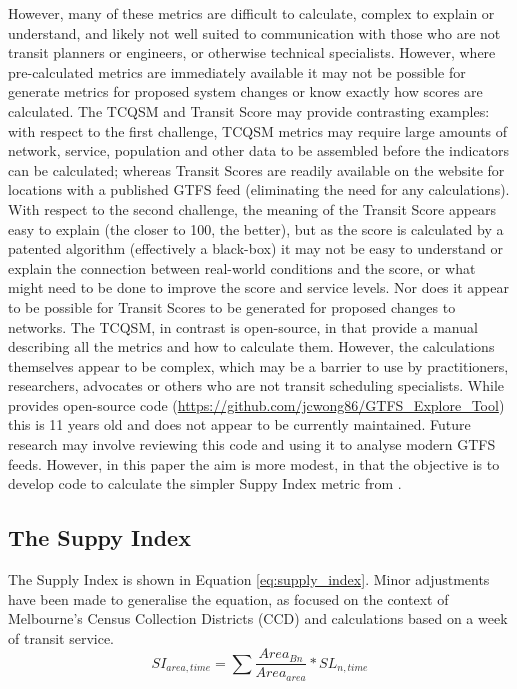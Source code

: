 \documentclass[numbered]{trbunofficial}
\begin{document}
However, many of these metrics are difficult to calculate, complex to
explain or understand, and likely not well suited to communication with
those who are not transit planners or engineers, or otherwise technical
specialists. However, where pre-calculated metrics are immediately
available it may not be possible for generate metrics for proposed
system changes or know exactly how scores are calculated. The TCQSM and
Transit Score may provide contrasting examples: with respect to the
first challenge, TCQSM metrics may require large amounts of network,
service, population and other data to be assembled before the indicators
can be calculated; whereas Transit Scores are readily available on the
\citet{WalkScore:2023tg} website for locations with a published GTFS
feed (eliminating the need for any calculations). With respect to the
second challenge, the meaning of the Transit Score appears easy to
explain (the closer to 100, the better), but as the score is calculated
by a patented algorithm (effectively a black-box) it may not be easy to
understand or explain the connection between real-world conditions and
the score, or what might need to be done to improve the score and
service levels. Nor does it appear to be possible for Transit Scores to
be generated for proposed changes to networks. The TCQSM, in contrast is
open-source, in that \citet{TCQSM:2013} provide a manual describing all
the metrics and how to calculate them. However, the calculations
themselves appear to be complex, which may be a barrier to use by
practitioners, researchers, advocates or others who are not transit
scheduling specialists. While \citet{Wong:2013aa} provides open-source
code (\url{https://github.com/jcwong86/GTFS_Explore_Tool}) this is 11
years old and does not appear to be currently maintained. Future
research may involve reviewing this code and using it to analyse modern
GTFS feeds. However, in this paper the aim is more modest, in that the
objective is to develop code to calculate the simpler Suppy Index metric
from \citet{currie2007identifying}.

\hypertarget{the-suppy-index}{%
\subsection{The Suppy Index}\label{the-suppy-index}}

The Supply Index is shown in Equation \ref{eq:supply_index}. Minor
adjustments have been made to generalise the equation, as
\citet{currie2007identifying} focused on the context of Melbourne's
Census Collection Districts (CCD) and calculations based on a week of
transit service. \begin{equation}
\label{eq:supply_index}
  SI_{area, time} = \sum{\frac{Area_{Bn}}{Area_{area}}*SL_{n, time}}
\end{equation}
\end{document}
